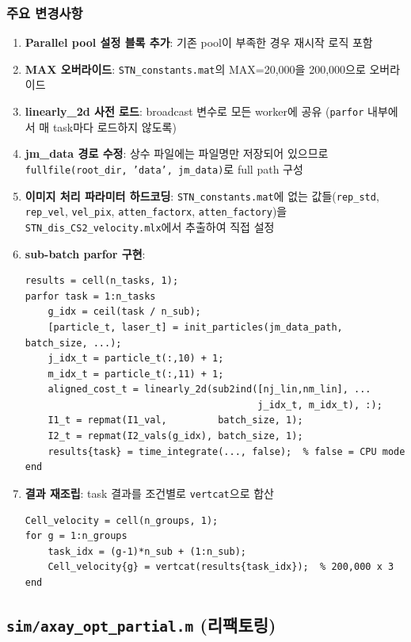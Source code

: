 \documentclass[11pt, a4paper]{article}
\begin{document}
\subsubsection{주요 변경사항}

\begin{enumerate}[itemsep=4pt]
  \item \textbf{Parallel pool 설정 블록 추가}: 기존 pool이 부족한 경우 재시작 로직 포함
  \item \textbf{MAX 오버라이드}: \texttt{STN\_constants.mat}의 MAX=20,000을
        200,000으로 오버라이드
  \item \textbf{linearly\_2d 사전 로드}: broadcast 변수로 모든 worker에 공유
        (\texttt{parfor} 내부에서 매 task마다 로드하지 않도록)
  \item \textbf{jm\_data 경로 수정}: 상수 파일에는 파일명만 저장되어 있으므로
        \texttt{fullfile(root\_dir, 'data', jm\_data)}로 full path 구성
  \item \textbf{이미지 처리 파라미터 하드코딩}: \texttt{STN\_constants.mat}에 없는
        값들(\texttt{rep\_std}, \texttt{rep\_vel}, \texttt{vel\_pix},
        \texttt{atten\_factorx}, \texttt{atten\_factory})을
        \texttt{STN\_dis\_CS2\_velocity.mlx}에서 추출하여 직접 설정

  \item \textbf{sub-batch parfor 구현}:
\begin{lstlisting}
results = cell(n_tasks, 1);
parfor task = 1:n_tasks
    g_idx = ceil(task / n_sub);
    [particle_t, laser_t] = init_particles(jm_data_path, batch_size, ...);
    j_idx_t = particle_t(:,10) + 1;
    m_idx_t = particle_t(:,11) + 1;
    aligned_cost_t = linearly_2d(sub2ind([nj_lin,nm_lin], ...
                                         j_idx_t, m_idx_t), :);
    I1_t = repmat(I1_val,         batch_size, 1);
    I2_t = repmat(I2_vals(g_idx), batch_size, 1);
    results{task} = time_integrate(..., false);  % false = CPU mode
end
\end{lstlisting}

  \item \textbf{결과 재조립}: task 결과를 조건별로 \texttt{vertcat}으로 합산
\begin{lstlisting}
Cell_velocity = cell(n_groups, 1);
for g = 1:n_groups
    task_idx = (g-1)*n_sub + (1:n_sub);
    Cell_velocity{g} = vertcat(results{task_idx});  % 200,000 x 3
end
\end{lstlisting}
\end{enumerate}

\subsection{\texttt{sim/axay\_opt\_partial.m} (리팩토링)}
\end{document}
